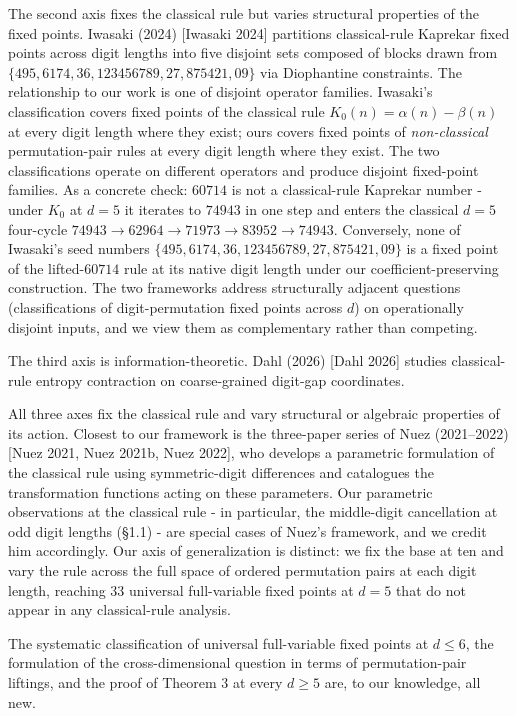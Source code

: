 \documentclass[11pt,letterpaper]{article}
\theoremstyle{paperstyle}
\theoremstyle{paperstyledef}
\theoremstyle{paperstylerem}
\begin{document}
The second axis fixes the classical rule but varies structural
properties of the fixed points. Iwasaki (2024) {[}Iwasaki 2024{]}
partitions classical-rule Kaprekar fixed points across digit lengths
into five disjoint sets composed of blocks drawn from
\(\{495, 6174, 36, 123456789, 27, 875421, 09\}\) via Diophantine
constraints. The relationship to our work is one of disjoint operator
families. Iwasaki's classification covers fixed points of the classical
rule \(K_0(n) = \alpha(n) - \beta(n)\) at every digit length where they
exist; ours covers fixed points of \emph{non-classical} permutation-pair
rules at every digit length where they exist. The two classifications
operate on different operators and produce disjoint fixed-point
families. As a concrete check: \(60714\) is not a classical-rule
Kaprekar number - under \(K_0\) at \(d = 5\) it iterates to \(74943\)
in one step and enters the classical \(d = 5\) four-cycle
\(74943 \to 62964 \to 71973 \to 83952 \to 74943\). Conversely, none of
Iwasaki's seed numbers \(\{495, 6174, 36, 123456789, 27, 875421, 09\}\)
is a fixed point of the lifted-\(60714\) rule at its native digit length
under our coefficient-preserving construction. The two frameworks
address structurally adjacent questions (classifications of
digit-permutation fixed points across \(d\)) on operationally disjoint
inputs, and we view them as complementary rather than competing.

The third axis is information-theoretic. Dahl (2026) {[}Dahl 2026{]}
studies classical-rule entropy contraction on coarse-grained digit-gap
coordinates.

All three axes fix the classical rule and vary structural or algebraic
properties of its action. Closest to our framework is the three-paper
series of Nuez (2021--2022) {[}Nuez 2021, Nuez 2021b, Nuez 2022{]}, who
develops a parametric formulation of the classical rule using
symmetric-digit differences and catalogues the transformation functions
acting on these parameters. Our parametric observations at the classical
rule - in particular, the middle-digit cancellation at odd digit
lengths (§1.1) - are special cases of Nuez's framework, and we credit
him accordingly. Our axis of generalization is distinct: we fix the base
at ten and vary the rule across the full space of ordered permutation
pairs at each digit length, reaching \(33\) universal full-variable
fixed points at \(d = 5\) that do not appear in any classical-rule
analysis.

The systematic classification of universal full-variable fixed points at
\(d \leq 6\), the formulation of the cross-dimensional question in terms
of permutation-pair liftings, and the proof of Theorem 3 at every
\(d \geq 5\) are, to our knowledge, all new.
\end{document}
